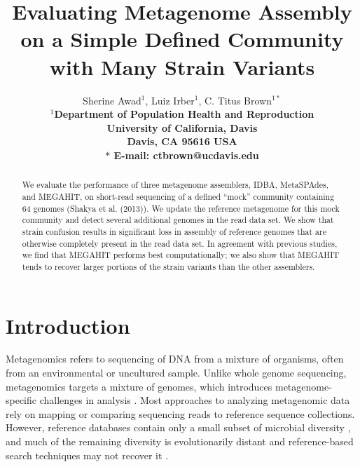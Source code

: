 \documentclass[11pt]{article}
\begin{document}
\title{Evaluating Metagenome Assembly on a Simple Defined Community with Many Strain Variants}

\author{Sherine Awad$^{1}$, Luiz Irber$^{1}$, C. Titus Brown$^{1\ast}$\\
\small
\bf{$^1$}Department of Population Health and Reproduction \\
\small
University of California, Davis\\
\small
Davis, CA 95616 USA\\
\small
$\ast$ E-mail: ctbrown@ucdavis.edu
} 

\maketitle


\begin{abstract}
 
  We evaluate the performance of three metagenome assemblers, IDBA,
  MetaSPAdes, and MEGAHIT, on short-read sequencing of a defined ``mock''
  community containing 64 genomes (Shakya et al. (2013)).  We update
  the reference metagenome for this mock community and detect several
  additional genomes in the read data set.  We show that strain
  confusion results in significant loss in assembly of reference
  genomes that are otherwise completely present in the read data set.
  In agreement with previous studies, we find that MEGAHIT performs
  best computationally; we also show that MEGAHIT tends to recover
  larger portions of the strain variants than the other assemblers.
  
\end{abstract}

\clearpage

\section*{Introduction}

Metagenomics refers to sequencing of DNA from a mixture of organisms,
often from an environmental or uncultured sample. Unlike whole genome
sequencing, metagenomics targets a mixture of genomes, which
introduces metagenome-specific challenges in analysis
\cite{ghurye2016metagenomic}.  Most approaches to analyzing
metagenomic data rely on mapping or comparing sequencing reads to
reference sequence collections. However, reference databases contain
only a small subset of microbial diversity \cite{geba}, and much
of the remaining diversity is evolutionarily distant and reference-based search
techniques may not recover it \cite{CAMI}.
\end{document}
